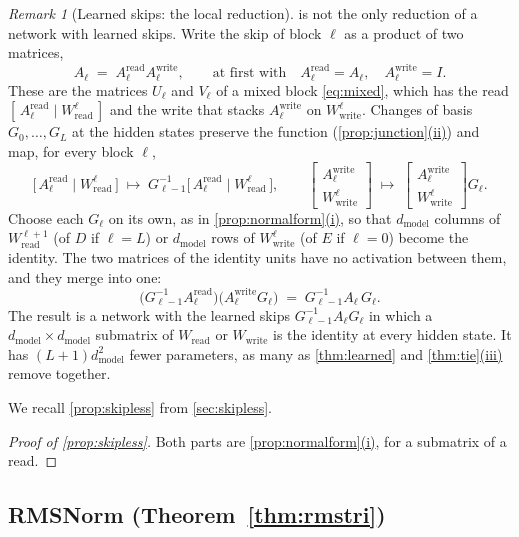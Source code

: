 \documentclass[10pt]{article}
\theoremstyle{definition}
\theoremstyle{remark}
\newtheorem{remark}[theorem]{Remark}
\newcommand{\Wread}{W_{\mathrm{read}}}
\newcommand{\Wwrite}{W_{\mathrm{write}}}
\newcommand{\dm}{d_{\mathrm{model}}}
\DeclareRobustCommand{\cpref}[2]{\hyperref[#1:#2]{\cref*{#1}(#2)}}
\begin{document}
\begin{remark}[Learned skips: the local reduction]\label{rem:locallearned}
 is not the only reduction of a network with learned skips. Write the skip of block $\ell$ as a product of two matrices,
\[
A_\ell \;=\; A^{\mathrm{read}}_\ell A^{\mathrm{write}}_\ell, \qquad\text{at first with}\quad A^{\mathrm{read}}_\ell = A_\ell,\quad A^{\mathrm{write}}_\ell = I .
\]
These are the matrices $U_\ell$ and $V_\ell$ of a mixed block \eqref{eq:mixed}, which has the read $[\,A^{\mathrm{read}}_\ell \mid \Wread^{\ell}\,]$ and the write that stacks $A^{\mathrm{write}}_\ell$ on $\Wwrite^{\ell}$. Changes of basis $G_0, \dots, G_L$ at the hidden states preserve the function (\cpref{prop:junction}{ii}) and map, for every block $\ell$,
\[
\big[\,A^{\mathrm{read}}_\ell \mid \Wread^{\ell}\,\big] \;\mapsto\; G_{\ell-1}^{-1}\big[\,A^{\mathrm{read}}_\ell \mid \Wread^{\ell}\,\big], \qquad
\begin{bmatrix} A^{\mathrm{write}}_\ell \\ \Wwrite^{\ell} \end{bmatrix} \;\mapsto\; \begin{bmatrix} A^{\mathrm{write}}_\ell \\ \Wwrite^{\ell} \end{bmatrix} G_\ell .
\]
Choose each $G_\ell$ on its own, as in \cpref{prop:normalform}{i}, so that $\dm$ columns of $\Wread^{\ell+1}$ (of $D$ if $\ell = L$) or $\dm$ rows of $\Wwrite^{\ell}$ (of $E$ if $\ell = 0$) become the identity. The two matrices of the identity units have no activation between them, and they merge into one:
\[
\big(G_{\ell-1}^{-1}A^{\mathrm{read}}_\ell\big)\big(A^{\mathrm{write}}_\ell G_\ell\big) \;=\; G_{\ell-1}^{-1}A_\ell\,G_\ell .
\]
The result is a network with the learned skips $G_{\ell-1}^{-1}A_\ell G_\ell$ in which a $\dm\times\dm$ submatrix of $\Wread$ or $\Wwrite$ is the identity at every hidden state. It has $(L+1)\dm^2$ fewer parameters, as many as \cref{thm:learned} and \cpref{thm:tie}{iii} remove together.
\end{remark}


We recall \cref{prop:skipless} from \cref{sec:skipless}.
\propSkipless*

\begin{proof}[Proof of \cref{prop:skipless}]
Both parts are \cpref{prop:normalform}{i}, for a submatrix of a read.
\end{proof}


\subsection{RMSNorm\texorpdfstring{ (Theorem~\ref*{thm:rmstri})}{}}\label{app:prf-rms}
\end{document}

